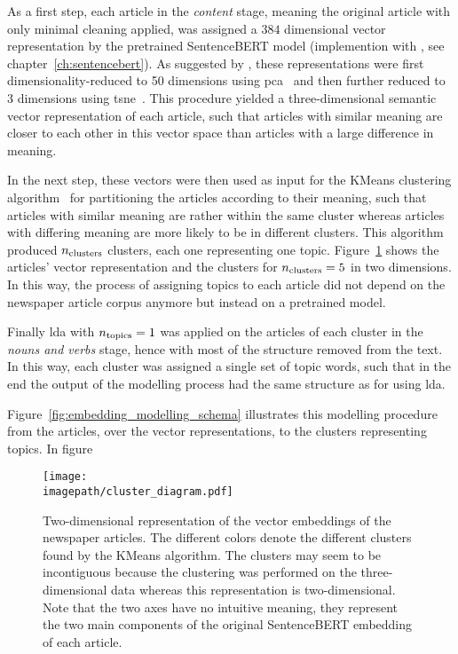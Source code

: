 As a first step, each article in the \textit{content} stage, meaning the original article with only minimal cleaning applied, was assigned a $384$ dimensional vector representation by the pretrained SentenceBERT model (implemention with \textcite{sbertsentencetransformers_sentencetransformers_2022}, see chapter~\ref{ch:sentencebert}). As suggested by \textcite{black_using_2020}, these representations were first dimensionality-reduced to \SI{50}{} dimensions using \gls{pca}~\autocite{pearson_liii_1901} and then further reduced to \SI{3}{} dimensions using \gls{tsne}~\autocite{maaten_visualizing_2008}. This procedure yielded a three-dimensional semantic vector representation of each article, such that articles with similar meaning are closer to each other in this vector space than articles with a large difference in meaning.

In the next step, these vectors were then used as input for the KMeans clustering algorithm~\autocite{macqueen_methods_1967} for partitioning the articles according to their meaning, such that articles with similar meaning are rather within the same cluster whereas articles with differing meaning are more likely to be in different clusters. This algorithm produced $n_\text{clusters}$ clusters, each one representing one topic. Figure~\ref{fig:clusters} shows the articles' vector representation and the clusters for $n_\text{clusters}=5$ in two dimensions. In this way, the process of assigning topics to each article did not depend on the newspaper article corpus anymore but instead on a pretrained model.

Finally \gls{lda} with $n_\text{topics}=1$ was applied on the articles of each cluster in the \textit{nouns and verbs} stage, hence with most of the structure removed from the text. In this way, each cluster was assigned a single set of topic words, such that in the end the output of the modelling process had the same structure as for using \gls{lda}.

Figure~\ref{fig:embedding_modelling_schema} illustrates this modelling procedure from the articles, over the vector representations, to the clusters representing topics. In figure~

\begin{figure}
    \centering
    \texttt{[image: \\imagepath/cluster\_diagram.pdf]}
    \caption{Two-dimensional representation of the vector embeddings of the newspaper articles. The different colors denote the different clusters found by the KMeans algorithm. The clusters may seem to be incontiguous because the clustering was performed on the three-dimensional data whereas this representation is two-dimensional. Note that the two axes have no intuitive meaning, they represent the two main components of the original SentenceBERT embedding of each article.}\label{fig:clusters}
\end{figure}

